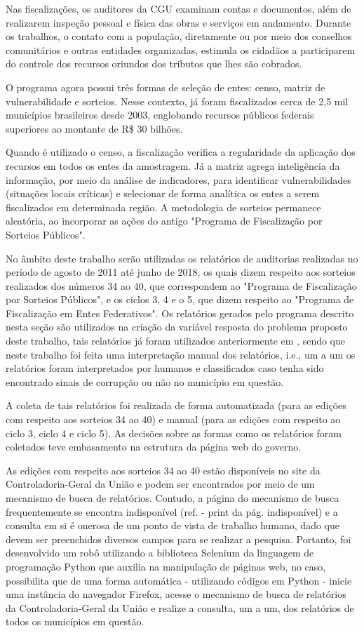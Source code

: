 Nas fiscalizações, os auditores da CGU examinam contas e documentos, além de realizarem inspeção pessoal e física das obras e serviços em andamento. Durante os trabalhos, o contato com a população, diretamente ou por meio dos conselhos comunitários e outras entidades organizadas, estimula os cidadãos a participarem do controle dos recursos oriundos dos tributos que lhes são cobrados.

O programa agora possui três formas de seleção de entes: censo, matriz de vulnerabilidade e sorteios. Nesse contexto, já foram fiscalizados cerca de 2,5 mil municípios brasileiros desde 2003, englobando recursos públicos federais superiores ao montante de R\$ 30 bilhões.

Quando é utilizado o censo, a fiscalização verifica a regularidade da aplicação dos recursos em todos os entes da amostragem. Já a matriz agrega inteligência da informação, por meio da análise de indicadores, para identificar vulnerabilidades (situações locais críticas) e selecionar de forma analítica os entes a serem fiscalizados em determinada região. A metodologia de sorteios permanece aleatória, ao incorporar as ações do antigo "Programa de Fiscalização por Sorteios Públicos".

No âmbito deste trabalho serão utilizadas os relatórios de auditorias realizadas no período de agosto de 2011 até junho de 2018, os quais dizem respeito aos sorteios realizados dos números 34 ao 40, que correspondem ao "Programa de Fiscalização por Sorteios Públicos", e os ciclos 3, 4 e o 5, que dizem respeito ao "Programa de Fiscalização em Entes Federativos". Os relatórios gerados pelo programa descrito nesta seção são utilizados na criação da variável resposta do problema proposto deste trabalho, tais relatórios já foram utilizados anteriormente em \citep{FerrazFinan2008}, sendo que neste trabalho foi feita uma interpretação manual dos relatórios, i.e., um a um os relatórios foram interpretados por humanos e classificados caso tenha sido encontrado sinais de corrupção ou não no município em questão.

A coleta de tais relatórios foi realizada de forma automatizada (para as edições com respeito aos sorteios 34 ao 40) e manual (para as edições com respeito ao ciclo 3, ciclo 4 e ciclo 5). As decisões sobre as formas como os relatórios foram coletados teve embasamento na estrutura da página web do governo.

As edições com respeito aos sorteios 34 ao 40 estão disponíveis no site da Controladoria-Geral da União e podem ser encontrados por meio de um mecanismo de busca de relatórios. Contudo, a página do mecanismo de busca frequentemente se encontra indisponível (ref. - print da pág. indisponível) e a consulta em si é onerosa de um ponto de vista de trabalho humano, dado que devem ser preenchidos diversos campos para se realizar a pesquisa. Portanto, foi desenvolvido um robô utilizando a biblioteca Selenium \cite{Selenium} da linguagem de programação Python que auxilia na manipulação de páginas web, no caso, possibilita que de uma forma automática - utilizando códigos em Python - inicie uma instância do navegador Firefox, acesse o mecanismo de busca de relatórios da Controladoria-Geral da União e realize a consulta, um a um, dos relatórios de todos os municípios em questão.

